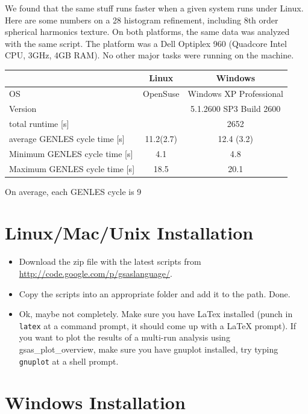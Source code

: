 We found that the same stuff runs faster when a given system runs under Linux. Here are some numbers on a 28 histogram refinement, including 8th order spherical harmonics texture. On both platforms, the same data was analyzed with the same script. The platform was a Dell Optiplex 960 (Quadcore Intel CPU, 3GHz, 4GB RAM). No other major tasks were running on the machine.
\begin{tabular}{|l|c|c|}
\hline
&Linux&Windows\\
\hline
OS&OpenSuse&Windows XP Professional\\
Version&&5.1.2600 SP3 Build 2600\\
total runtime [s]&&2652\\
average GENLES cycle time [s]&11.2(2.7)&12.4 (3.2)\\
Minimum GENLES cycle time [s]&4.1&4.8\\
Maximum GENLES cycle time [s]&18.5&20.1\\
\hline
\end{tabular}
On average, each GENLES cycle is 9%
\section{Linux/Mac/Unix Installation}

\begin{itemize}
\item Download the zip file with the latest scripts from \url{http://code.google.com/p/gsaslanguage/}. 
\item Copy the scripts into an appropriate folder and add it to the path. Done.
\item Ok, maybe not completely. Make sure you have LaTex installed (punch in \texttt{latex} at a command prompt, it should come up with a LaTeX prompt). If you want to plot the results of a multi-run analysis using gsas\_plot\_overview, make sure you have gnuplot installed, try typing \texttt{gnuplot} at a shell prompt.
\end{itemize}

\section{Windows Installation}

